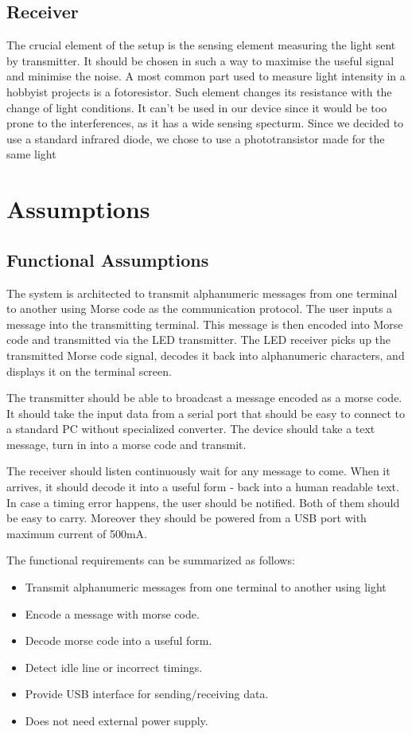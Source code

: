 \documentclass[12pt]{article}
\begin{document}
  
  \subsection{Receiver}
  The crucial element of the setup is the sensing element measuring the light sent by transmitter.
  It should be chosen in such a way to maximise the useful signal and minimise the noise.
  A most common part used to measure light intensity in a hobbyist projects is a fotoresistor. Such element changes its resistance with the change of light conditions. 
  It can't be used in our device since it would be too prone to the interferences, as it has a wide sensing specturm.
  Since we decided to use a standard infrared diode, we chose to use a phototransistor made for the same light 
\newpage	
	\section{Assumptions}
	\subsection{Functional Assumptions}
  The system is architected to transmit alphanumeric messages from one terminal to another using Morse code as the communication protocol. The user inputs a message into the transmitting terminal. This message is then encoded into Morse code and 
  transmitted via the LED transmitter. The LED receiver picks up the transmitted Morse code signal, decodes it back into alphanumeric characters, and displays it on the terminal screen.

  The transmitter should be able to broadcast a message encoded as a morse code. It should take the input data from a serial port that should be easy to connect to a standard PC without specialized converter.
  The device should take a text message, turn in into a morse code and transmit.

  The receiver should listen continuously wait for any message to come. When it arrives, it should decode it into a useful form - back into a human readable text. In case a timing error happens, the user should be notified.
  Both of them should be easy to carry. Moreover they should be powered from a USB port with maximum current of 500mA.
  
  \vspace{20pt}
\noindent The functional requirements can be summarized as follows:
  \begin{itemize}
    \item Transmit alphanumeric messages from one terminal to another using light
    \item Encode a message with morse code.
    \item Decode morse code into a useful form.
    \item Detect idle line or incorrect timings.
    \item Provide USB interface for sending/receiving data.
    \item Does not need external power supply.
    
  \end{itemize}
\end{document}
